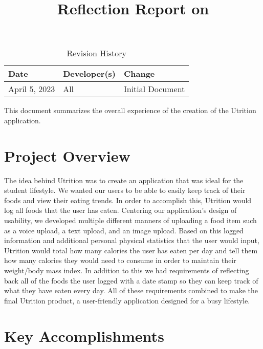 \documentclass{article}
\title{Reflection Report on \progname}
\author{\authname}
\date{}
\begin{document}
\begin{table}[hp]
\caption{Revision History} \label{TblRevisionHistory}
\begin{tabularx}{\textwidth}{llX}
\toprule
\textbf{Date} & \textbf{Developer(s)} & \textbf{Change}\\
\midrule
April 5, 2023 & All & Initial Document\\
\bottomrule
\end{tabularx}
\end{table}

\newpage

\maketitle

This document summarizes the overall experience of the creation of the Utrition application. 

\section{Project Overview}


The idea behind Utrition was to create an application that was ideal for the student lifestyle. We wanted our users to be able to easily keep track of their foods and view their eating trends. In order to accomplish this, Utrition would log all foods that the user has eaten. Centering our application's design of usability, we developed multiple different manners of uploading a food item such as a voice upload, a text upload, and an image upload. Based on this logged information and additional personal physical statistics that the user would input, Utrition would total how many calories the user has eaten per day and tell them how many calories they would need to consume in order to maintain their weight/body mass index. In addition to this we had requirements of reflecting back all of the foods the user logged with a date stamp so they can keep track of what they have eaten every day. All of these requirements combined to make the final Utrition product, a user-friendly application designed for a busy lifestyle.


\section{Key Accomplishments}

\end{document}
